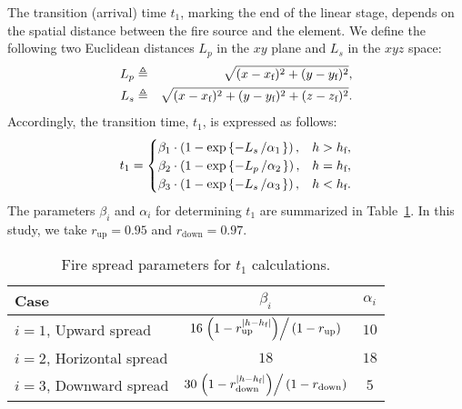 The transition (arrival) time $t_1$, marking the end of the linear stage, depends on the spatial distance between the fire source and the element. We define the following two Euclidean distances $L_p$ in the $xy$ plane and $L_s$ in the $xyz$ space:
\begin{eqnarray}
L_p & \triangleq & \sqrt{(x - x_{\text{f}})^2 + (y - y_{\text{f}})^2}, \\
\label{eq:Lp}
L_s & \triangleq & \sqrt{(x - x_{\text{f}})^2 + (y - y_{\text{f}})^2 + (z - z_{\text{f}})^2}.
\label{eq:Ls}
\end{eqnarray}
Accordingly, the transition time, $t_1$, is expressed as follows:
\begin{equation}
    t_1 = 
    \begin{cases}
    \beta_{1} \cdot \left(1 - \exp\left\{- L_s\left/\alpha_{1}\right.\right\}\right), & h > h_{\text{f}}, \\
    \beta_{2} \cdot \left(1 - \exp\left\{- L_p\left/\alpha_{2}\right.\right\}\right), & h = h_{\text{f}}, \\
    \beta_{3} \cdot \left(1 - \exp\left\{- L_s\left/\alpha_{3}\right.\right\}\right), & h < h_{\text{f}} .
    \end{cases}
    \label{eq:t1}
\end{equation}
The parameters $\beta_i$ and $\alpha_i$ for determining $t_1$ are summarized in Table~\ref{tab:fire_spread_parameters}. In this study, we take $r_{\mathrm{up}}=0.95$ and $r_{\mathrm{down}}=0.97$.
\begin{table}[ht]
    \centering
    \caption{Fire spread parameters for $t_1$ calculations.}
    \begin{tabular}{lcc}
        \toprule
        Case  & $\beta_i$ & $\alpha_i$  \\
        \midrule
        $i=1$, Upward spread & $16 \left.\left(1-r_{\mathrm{up}}^{\left|h-h_{\text{f}}\right|}\right)\right/\left(1-r_{\mathrm{up}}\right)$ & $10$  \\
        $i=2$, Horizontal spread & $18$ & $18$  \\
        $i=3$, Downward spread & $30 \left.\left(1-r_{\mathrm{down}}^{\left|h-h_{\text{f}}\right|}\right)\right/\left(1-r_{\mathrm{down}}\right)$ & $5$  \\
        \bottomrule
    \end{tabular}
    \label{tab:fire_spread_parameters}
\end{table}

